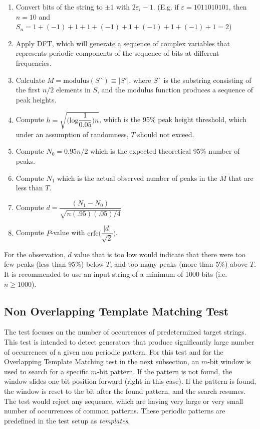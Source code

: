 \begin{enumerate}
    \item Convert bits of the string to $\pm 1$ with $2\varepsilon_i - 1$. (E.g. if $\varepsilon = 1011010101$, then $n=10$ and $S_n = 1 + (-1) + 1 + 1 + (-1) + 1 + (-1) + 1 + (-1) + 1 = 2$)
    
    \item Apply DFT, which will generate a sequence of complex variables that represents periodic components of the sequence of bits at different frequencies.
    
    \item Calculate $M = \text{modulus}(S´) \equiv |S'|$, where $S´$ is the substring consisting of the first $n/2$ elements in $S$, and the modulus function produces a sequence of peak heights.
    
    \item Compute $h = \sqrt{\bigg(\text{log}\dfrac{1}{0.05}\bigg)n}$, which is the 95\% peak height threshold, which under an assumption of randomness, $T$ should not exceed.
    
    \item Compute $N_0 = 0.95n/2$ which is the expected theoretical 95\% number of peaks.
    
    \item Compute $N_1$ which is the actual observed number of peaks in the $M$ that are less than $T$.
    
    \item Compute $d = \dfrac{(N_1 - N_0)}{\sqrt{n(.95)(.05)/4}}$
    
    \item Compute $P$-value with $\text{erfc}\bigg(\dfrac{\lvert d \rvert}{\sqrt{2}}\bigg)$.
\end{enumerate}

For the observation, $d$ value that is too low would indicate that there were too few peaks (less than 95\%) below $T$, and too many peaks (more than 5\%) above $T$. It is recommended to use an input string of a minimum of 1000 bits (i.e. $n \geq 1000$).

\subsection{Non Overlapping Template Matching Test}\label{subsec:notmt}

The test focuses on the number of occurrences of predetermined target strings. This test is intended to detect generators that produce significantly large number of occurrences of a given non periodic pattern. For this test and for the Overlapping Template Matching test in the next subsection, an $m$-bit window is used to search for a specific $m$-bit pattern. If the pattern is not found, the window slides one bit position forward (right in this case). If the pattern is found, the window is reset to the bit after the found pattern, and the search resumes. The test would reject any sequence, which are having very large or very small number of occurrences of common patterns. These periodic patterns are predefined in the test setup as \textit{templates}.

